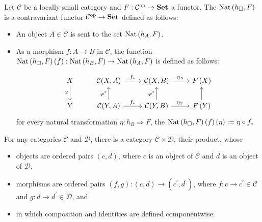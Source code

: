 \documentclass[12pt, oneside]{book}
\begin{document}
\begin{proposition}
    Let $\mathcal{C}$ be a locally small category and $F: \mathcal{C}^{\mathrm{op}} \rightarrow \mathbf{Set}$ a functor.
    The $\operatorname{Nat}\left(h_\square, F\right)$ is a contravariant functor $\mathcal{C}^{\mathrm{op}} \rightarrow \mathbf{Set}$ defined as follows:
    \begin{itemize}
        \item
              An object $A \in \mathcal{C}$ is sent to the set $\operatorname{Nat}\left(h_A, F\right)$.
        \item
              As a morphism $f: A \rightarrow B$ in $\mathcal{C}$, the function $\operatorname{Nat}\left(h_\square, F\right)\left(f\right): \operatorname{Nat}\left(h_{B}, F\right)\rightarrow \operatorname{Nat}\left(h_A, F\right)$ is defined as follows:

              \begin{equation*}
                  \begin{tikzcd}
                      X\arrow[d,"\varphi"']&\mathcal{C}(X,A)\arrow[r,"f_*"]&\mathcal{C}(X,B)\arrow[r,"\eta_X"]&F\left(X\right)\\
                      Y&\mathcal{C}(Y,A)\arrow[u,"\varphi^*"]\arrow[r,"f_*"]&\mathcal{C}(Y,B)\arrow[u,"\varphi^*"]\arrow[r,"\eta_Y"]&F\left(Y\right)\arrow[u,""]
                  \end{tikzcd}
              \end{equation*}
              for every natural transformation $\eta: h_B \Rightarrow F$, the $\operatorname{Nat}\left(h_\square, F\right)\left(f\right)(\eta):=\eta\circ f_* $
    \end{itemize}
\end{proposition}


\begin{definition}
    For any categories $\mathcal{C}$ and $\mathcal{D}$, there is a category $\mathcal{C} \times \mathcal{D}$, their product,
    whose
    \begin{itemize}
        \item
              objects are ordered pairs $\left(c, d\right)$, where $c$ is an object of $\mathcal{C}$ and $d$ is an object of $\mathcal{D}$,
        \item
              morphisms are ordered pairs $(f, g):(c, d) \rightarrow\left(c^{\prime}, d^{\prime}\right)$, where $f: c \rightarrow c^{\prime} \in \mathcal{C}$ and $g: d \rightarrow d^{\prime} \in \mathcal{D}$, and
        \item
              in which composition and identities are defined componentwise.
    \end{itemize}
\end{definition}
\end{document}
